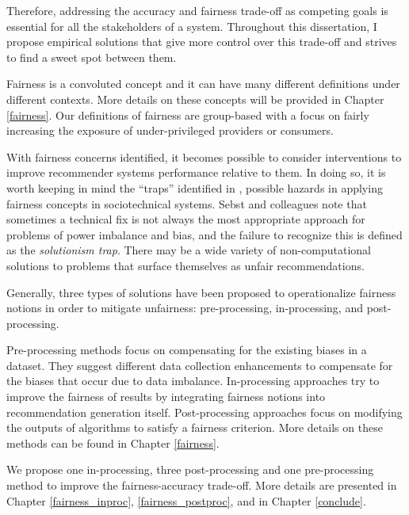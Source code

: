 


Therefore, addressing the accuracy and fairness trade-off as competing goals is essential for all the stakeholders of a system. Throughout this dissertation, I propose empirical solutions that give more control over this trade-off and strives to find a sweet spot between them. 

Fairness is a convoluted concept and it can have many different definitions under different contexts. More details on these concepts will be provided in Chapter \ref{fairness}. Our definitions of fairness are group-based with a focus on fairly increasing the exposure of under-privileged providers or consumers. 

With fairness concerns identified, it becomes possible to consider interventions to improve recommender systems performance relative to them. In doing so, it is worth keeping in mind the ``traps'' identified in \cite{selbst2019fairness}, possible hazards in applying fairness concepts in sociotechnical systems. Sebst and colleagues note that sometimes a technical fix is not always the most appropriate approach for problems of power imbalance and bias, and the failure to recognize this is defined as the \textit{solutionism trap}. There may be a wide variety of non-computational solutions to problems that surface themselves as unfair recommendations. 


Generally, three types of solutions have been proposed to operationalize fairness notions in order to mitigate  unfairness: pre-processing, in-processing, and post-processing.

Pre-processing methods focus on compensating for the existing biases in a dataset. They suggest different data collection enhancements to compensate for the biases that occur due to data imbalance. In-processing approaches try to improve the fairness of results by integrating fairness notions into recommendation generation itself. Post-processing approaches focus on modifying the outputs of algorithms to satisfy a fairness criterion. More details on these methods can be found in Chapter \ref{fairness}.

We propose one in-processing, three post-processing and one pre-processing method to improve the fairness-accuracy trade-off. More details are presented in Chapter \ref{fairness_inproc}, \ref{fairness_postproc}, and in Chapter \ref{conclude}.

